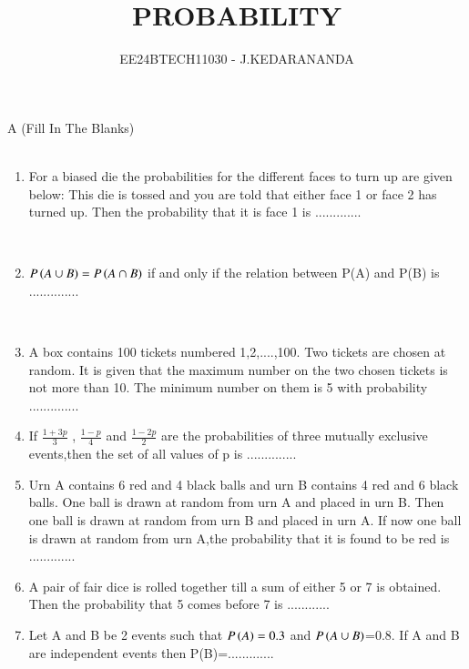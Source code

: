 \documentclass[journal]{IEEEtran}
\renewcommand{\thefigure}{\theenumi}
\renewcommand{\thetable}{\theenumi}
\numberwithin{equation}{enumi}
\numberwithin{figure}{enumi}
\renewcommand{\thetable}{\theenumi}
\begin{document}

\vspace{3cm}

\title{PROBABILITY}
\author{EE24BTECH11030 - J.KEDARANANDA}
{\let\newpage\relax\maketitle}
\renewcommand{\thefigure}{\theenumi}
\renewcommand{\thetable}{\theenumi}
A  (Fill In The Blanks)\\\\
\begin{enumerate}
    \item For a biased die the probabilities for the different faces to turn up are given below:
    \bigskip
    This die is tossed and you are told that either face 1 or face 2 has turned up. Then the probability that it is face 1 is .............
    
    \hfill{}\\
    
    \item $P\left(A \cup B\right)=P\left(A \cap B \right)$ if and only if the relation between P(A) and P(B) is .............. 
    
    \hfill{}\\
    \item A box contains 100 tickets numbered 1,2,....,100. Two tickets are chosen at random. It is given that the maximum number on the two chosen tickets is not more than 10. The minimum number on them is 5 with probability ..............\hfill{}\\
    \item If $\frac{1+3p}{3}$ , $\frac{1-p}{4}$ and $\frac{1-2p}{2}$ are the probabilities of three mutually exclusive events,then the set of all values of p is ..............\hfill{}\\
    \item Urn A contains 6 red and 4 black balls and urn B contains 4 red and 6 black balls. One ball is drawn at random from urn A and placed in urn B. Then one ball is drawn at random from urn B and placed in urn A. If now one ball is drawn at random from urn A,the probability that it is found to be red is .............\hfill{}\\
    \item A pair of fair dice is rolled together till a sum of either 5 or 7 is obtained. Then the probability that 5 comes before 7 is 
    ............
    \hfill{}\\
    \item Let A and B be 2 events such that $P\left(A\right)=0.3$ and $P\left(A \cup B\right)$=0.8. If A and B are independent events then P(B)=.............\hfill{}\\
    

\end{enumerate}
\end{document}
